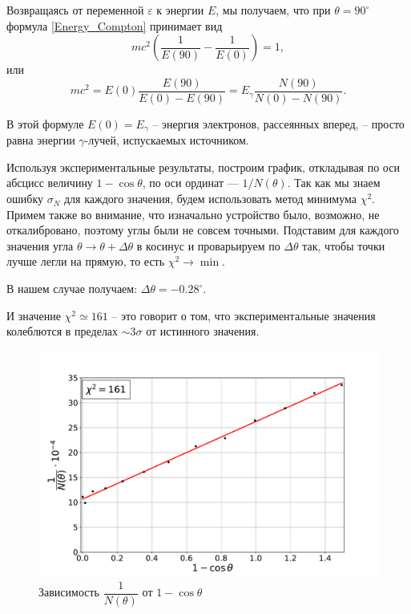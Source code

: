 \documentclass[12pt,a4paper]{article}
\begin{document}
	Возвращаясь от переменной $\varepsilon$ к энергии $E$, мы получаем, что при $\theta = 90^\circ$ формула \eqref{Energy_Compton} принимает вид
	\begin{equation*}
		mc^2 \left(\frac{1}{E(90)} - \frac{1}{E(0)}\right) = 1,
	\end{equation*}
	\noindent или
	\begin{equation}
		mc^2 = E(0)\frac{E(90)}{E(0) - E(90)} = E_\gamma \frac{N(90)}{N(0) - N(90)}.
		\label{Compton_mc2}
	\end{equation}
	
	В этой формуле $E(0) = E_\gamma$ -- энергия электронов, рассеянных вперед, -- просто равна энергии $\gamma$-лучей, испускаемых источником.
	
	
	Используя экспериментальные результаты, построим график, откладывая по оси абсцисс величину $1 - \cos\theta$, по оси ординат --- $1 / N(\theta)$. Так как мы знаем ошибку $\sigma_N$ для каждого значения, будем использовать метод минимума $\chi^2$. Примем также во внимание, что изначально устройство было, возможно, не откалибровано, поэтому углы были не совсем точными. Подставим для каждого значения угла $\theta \longrightarrow \theta + \Delta \theta$ в косинус и проварьируем по $\Delta\theta$ так, чтобы точки лучше легли на прямую, то есть $\chi^2 \rightarrow \min$.
	
	
	В нашем случае получаем: $\Delta \theta = -0.28^\circ$.
	
	И значение $\chi^2 \simeq 161$ -- это говорит о том, что экспериментальные значения колеблются в пределах $\sim 3\sigma$ от истинного значения.
	
	\begin{figure}[h!]
		\centering
		\includegraphics[width=\linewidth]{src/N(theta).pdf}
		\caption{Зависимость $\dfrac{1}{N(\theta)}$ от $1 - \cos \theta$}
	\end{figure}
\end{document}
